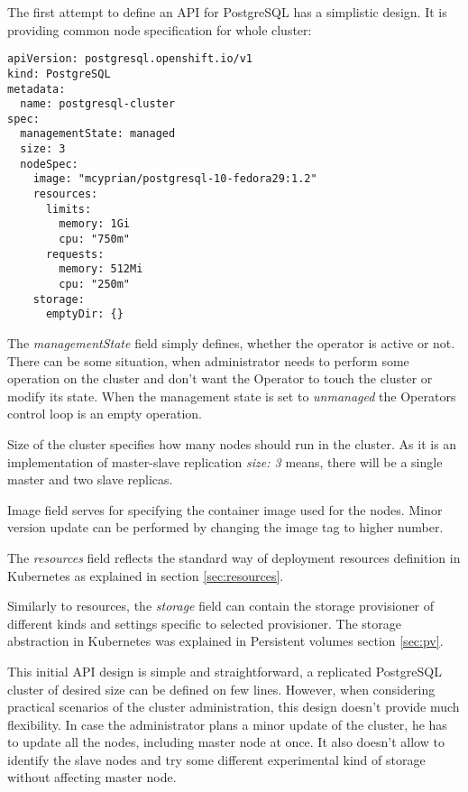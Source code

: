 \documentclass[
  digital, %
  twoside, %
  table,   %
  lof,     %
  lot,     %
]{fithesis3}
\begin{document}
The first attempt to define an API for PostgreSQL has a simplistic design.
It is providing common node specification for whole cluster:

\begin{lstlisting}
apiVersion: postgresql.openshift.io/v1
kind: PostgreSQL
metadata:
  name: postgresql-cluster
spec:
  managementState: managed
  size: 3
  nodeSpec:
    image: "mcyprian/postgresql-10-fedora29:1.2"
    resources:
      limits:
        memory: 1Gi
        cpu: "750m"
      requests:
        memory: 512Mi
        cpu: "250m"
    storage:
      emptyDir: {}
\end{lstlisting}

The \textit{managementState} field simply defines, whether the operator is active or not. There can be some situation, when administrator needs to perform some operation on the cluster and don't want the Operator to touch the cluster or modify its state. When the management state is set to \textit{unmanaged} the Operators control loop is an empty operation.

Size of the cluster specifies how many nodes should run in the cluster. As it is an implementation of master-slave replication \textit{size: 3} means, there will be a single master and two slave replicas.

Image field serves for specifying the container image used for the nodes. Minor version update can be performed by changing the image tag to higher number.

The \textit{resources} field reflects the standard way of deployment resources definition in Kubernetes as explained in section \ref{sec:resources}.

Similarly to resources, the \textit{storage} field can contain the storage provisioner of different kinds and settings specific to selected provisioner. The storage abstraction in Kubernetes was explained in Persistent volumes section \ref{sec:pv}.

This initial API design is simple and straightforward, a replicated PostgreSQL cluster of desired size can be defined on few lines. However, when considering practical scenarios of the cluster administration, this design doesn't provide much flexibility. In case the administrator plans a minor update of the cluster, he has to update all the nodes, including master node at once. It also doesn't allow to identify the slave nodes and try some different experimental kind of storage without affecting master node.
\end{document}
